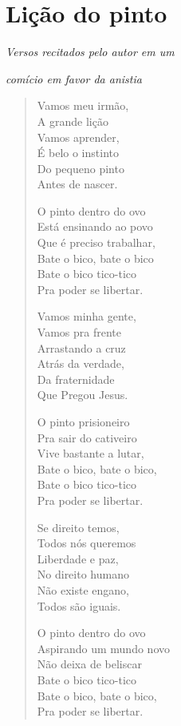 \chapter{Lição do pinto}

\hfill\emph{Versos recitados pelo autor em um}

\hfill\emph{comício em favor da anistia}


\begin{verse}
Vamos meu irmão,\\
A grande lição\\
Vamos aprender,\\
É belo o instinto\\
Do pequeno pinto\\
Antes de nascer.

O pinto dentro do ovo\\
Está ensinando ao povo\\
Que é preciso trabalhar,\\
Bate o bico, bate o bico\\
Bate o bico tico-tico\\
Pra poder se libertar.

Vamos minha gente,\\
Vamos pra frente\\
Arrastando a cruz\\
Atrás da verdade,\\
Da fraternidade\\
Que Pregou Jesus.

O pinto prisioneiro\\
Pra sair do cativeiro\\
Vive bastante a lutar,\\
Bate o bico, bate o bico,\\
Bate o bico tico-tico\\
Pra poder se libertar.

Se direito temos,\\
Todos nós queremos\\
Liberdade e paz,\\
No direito humano\\
Não existe engano,\\
Todos são iguais.

O pinto dentro do ovo\\
Aspirando um mundo novo\\
Não deixa de beliscar\\
Bate o bico tico-tico\\
Bate o bico, bate o bico,\\
Pra poder se libertar.
\end{verse}

